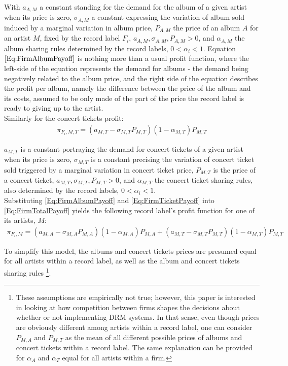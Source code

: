 \documentclass[a4paper,12pt]{article}
\numberwithin{equation}{section}
\begin{document}
With $a_{A, M}$ a constant standing for the demand for the album of a given artist when its price is zero, $\sigma_{A, M}$ a constant expressing the variation of album sold induced by a marginal variation in album price, $P_{A, M}$ the price of an album $A$ for an artist $M$, fixed by the record label $F_i$, $a_{A, M}, \sigma_{A, M}, P_{A, M} > 0$, and $\alpha_{A, M}$ the album sharing rules determined by the record labels, $0 < \alpha_i < 1$. Equation $\eqref{Eq:FirmAlbumPayoff}$ is nothing more than a usual profit function, where the left-side of the equation represents the demand for albums - the demand being negatively related to the album price, and the right side of the equation describes the profit per album, namely the difference between the price of the album and its costs, assumed to be only made of the part of the price the record label is ready to giving up to the artist.\\

Similarly for the concert tickets profit:
\begin{eqnarray}
\pi_{F_i, M, T} = (a_{M, T} - \sigma_{M, T} P_{M, T})(1 - \alpha_{M, T}) P_{M, T}
\label{Eq:FirmTicketPayoff}
\end{eqnarray}

$a_{M, T}$ is a constant portraying the demand for concert tickets of a given artist when its price is zero, $\sigma_{M, T}$ is a constant precising the variation of concert ticket sold triggered by a marginal variation in concert ticket price, $P_{M, T}$ is the price of a concert ticket, $a_{M, T}, \sigma_{M, T}, P_{M, T} > 0$, and $\alpha_{M, T}$ the concert ticket sharing rules, also determined by the record labels, $0 < \alpha_i < 1$.\\

Substituting \eqref{Eq:FirmAlbumPayoff} and \eqref{Eq:FirmTicketPayoff} into \eqref{Eq:FirmTotalPayoff} yields the following record label’s profit function for one of its artists, $M$:
\begin{eqnarray}
\pi_{F_i, M} = (a_{M, A} - \sigma_{M, A} P_{M, A})(1 - \alpha_{M, A}) P_{M, A} +
	(a_{M, T} - \sigma_{M, T} P_{M, T})(1 - \alpha_{M, T}) P_{M, T}
\end{eqnarray}

To simplify this model, the albums and concert tickets prices are presumed equal for all artists within a record label, as well as the album and concert tickets sharing rules \footnote{
These assumptions are empirically not true; however, this paper is interested in looking at how competition between firms shapes the decisions about whether or not implementing DRM systems. In that sense, even though prices are obviously different among artists within a record label, one can consider $P_{M, A}$ and $P_{M, T}$ as the mean of all different possible prices of albums and concert tickets within a record label. The same explanation can be provided for $\alpha_A$ and $\alpha_T$ equal for all artists within a firm.
}.
\end{document}
